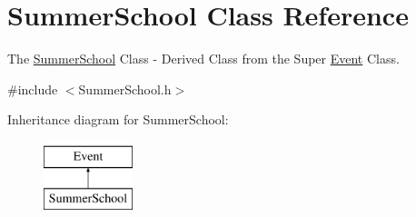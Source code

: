 \hypertarget{classSummerSchool}{}\section{Summer\+School Class Reference}
\label{classSummerSchool}


The \mbox{\hyperlink{classSummerSchool}{Summer\+School}} Class -\/ Derived Class from the Super \mbox{\hyperlink{classEvent}{Event}} Class.  




{\ttfamily \#include $<$Summer\+School.\+h$>$}

Inheritance diagram for Summer\+School\+:\begin{figure}[H]
\begin{center}
\leavevmode
\includegraphics[height=2.000000cm]{classSummerSchool}
\end{center}
\end{figure}
